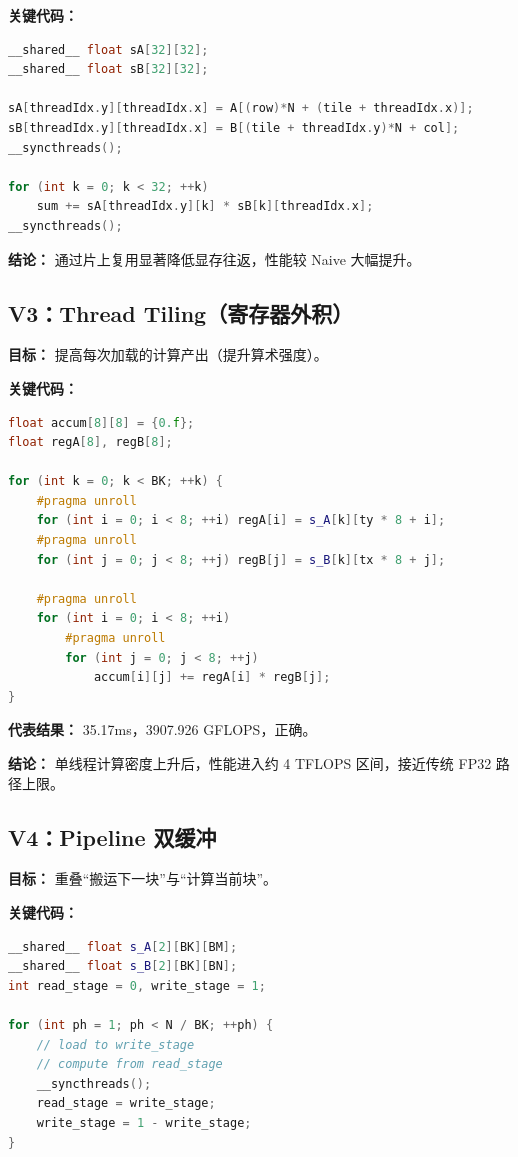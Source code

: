 \documentclass[12pt,a4paper]{ctexart}
\begin{document}
\textbf{关键代码：}
\begin{lstlisting}[language=C++]
__shared__ float sA[32][32];
__shared__ float sB[32][32];

sA[threadIdx.y][threadIdx.x] = A[(row)*N + (tile + threadIdx.x)];
sB[threadIdx.y][threadIdx.x] = B[(tile + threadIdx.y)*N + col];
__syncthreads();

for (int k = 0; k < 32; ++k)
    sum += sA[threadIdx.y][k] * sB[k][threadIdx.x];
__syncthreads();
\end{lstlisting}

\textbf{结论：}
通过片上复用显著降低显存往返，性能较 Naive 大幅提升。

\subsection{V3：Thread Tiling（寄存器外积）}
\textbf{目标：} 提高每次加载的计算产出（提升算术强度）。

\textbf{关键代码：}
\begin{lstlisting}[language=C++]
float accum[8][8] = {0.f};
float regA[8], regB[8];

for (int k = 0; k < BK; ++k) {
    #pragma unroll
    for (int i = 0; i < 8; ++i) regA[i] = s_A[k][ty * 8 + i];
    #pragma unroll
    for (int j = 0; j < 8; ++j) regB[j] = s_B[k][tx * 8 + j];

    #pragma unroll
    for (int i = 0; i < 8; ++i)
        #pragma unroll
        for (int j = 0; j < 8; ++j)
            accum[i][j] += regA[i] * regB[j];
}
\end{lstlisting}

\textbf{代表结果：} 35.17ms，3907.926 GFLOPS，正确。

\textbf{结论：}
单线程计算密度上升后，性能进入约 4 TFLOPS 区间，接近传统 FP32 路径上限。

\subsection{V4：Pipeline 双缓冲}
\textbf{目标：} 重叠“搬运下一块”与“计算当前块”。

\textbf{关键代码：}
\begin{lstlisting}[language=C++]
__shared__ float s_A[2][BK][BM];
__shared__ float s_B[2][BK][BN];
int read_stage = 0, write_stage = 1;

for (int ph = 1; ph < N / BK; ++ph) {
    // load to write_stage
    // compute from read_stage
    __syncthreads();
    read_stage = write_stage;
    write_stage = 1 - write_stage;
}
\end{lstlisting}
\end{document}
